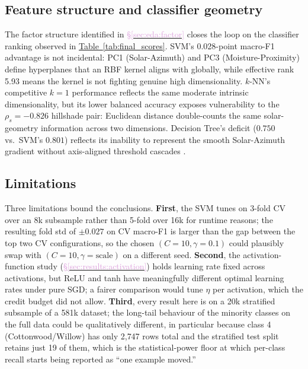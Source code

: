 \documentclass[conference]{IEEEtran}
\newcommand{\tabref}[1]{\hyperref[#1]{\textcolor{sage}{Table~\ref*{#1}}}}
\newcommand{\secref}[1]{\hyperref[#1]{\textcolor{plum}{\S\ref*{#1}}}}
\begin{document}
\subsection{Feature structure and classifier geometry}\label{sec:disc:geom}
The factor structure identified in \secref{sec:eda:factor}
closes the loop on the classifier ranking observed
in \tabref{tab:final_scores}.
SVM's 0.028-point macro-F1 advantage is not incidental: PC1 (Solar-Azimuth)
and PC3 (Moisture-Proximity) define hyperplanes that an RBF kernel aligns
with globally, while effective rank 5.93 means the kernel is not fighting
genuine high dimensionality.
$k$-NN's competitive $k{=}1$ performance reflects the same moderate intrinsic
dimensionality, but its lower balanced accuracy exposes vulnerability to the
$\rho_s{=}{-}0.826$ hillshade pair: Euclidean distance double-counts the
same solar-geometry information across two dimensions.
Decision Tree's deficit ($0.750$ vs.\ SVM's $0.801$) reflects its inability
to represent the smooth Solar-Azimuth gradient without axis-aligned
threshold cascades \cite{cortes1995svm}.

\subsection{Limitations}\label{sec:disc:limits}
Three limitations bound the conclusions. \textbf{First}, the SVM tunes on
3-fold CV over an 8k subsample rather than 5-fold over 16k for runtime
reasons; the resulting fold std of $\pm 0.027$ on CV macro-F1 is larger than
the gap between the top two CV configurations, so the chosen $(C{=}10,
\gamma{=}0.1)$ could plausibly swap with $(C{=}10, \gamma{=}\text{scale})$
on a different seed. \textbf{Second}, the activation-function study
(\secref{sec:results:activation}) holds learning rate fixed across
activations, but ReLU and tanh have meaningfully different optimal learning
rates under pure SGD; a fairer comparison would tune $\eta$ per activation,
which the credit budget did not allow. \textbf{Third}, every result here is
on a 20k stratified subsample of a 581k dataset; the long-tail behaviour of
the minority classes on the full data could be qualitatively different, in
particular because class 4 (Cottonwood/Willow) has only 2{,}747 rows total
and the stratified test split retains just 19 of them, which is the
statistical-power floor at which per-class recall starts being reported as
``one example moved.''
\end{document}
